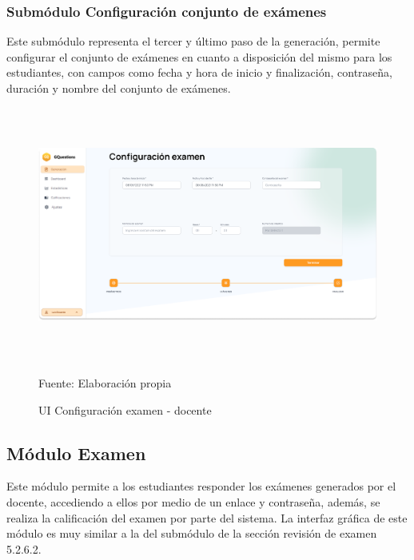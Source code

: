 \documentclass[../Main.tex]{subfiles}
\begin{document}
    \subsubsection{Submódulo Configuración conjunto de exámenes}
    \begin{justify}
    Este submódulo representa el tercer y último paso de la generación, permite configurar el conjunto de exámenes en cuanto a disposición del mismo para los estudiantes, con campos como fecha y hora de inicio y finalización, contraseña, duración y nombre del conjunto de exámenes.
    
    \begin{figure}[H]
	\begin{Center}
		\includegraphics[width=6.4in,height=3.3in]{Images/ui_docente_conf_examen.png}
	    \caption{UI Configuración examen - docente}
	    Fuente: Elaboración propia
        \label{fig:section}
	\end{Center}
    \end{figure}
    \end{justify}
    
    \subsection{Módulo Examen}
    \begin{justify}
    Este módulo permite a los estudiantes responder los exámenes generados por el docente, accediendo a ellos por medio de un enlace y contraseña, además, se realiza la calificación del examen por parte del sistema. La interfaz gráfica de este módulo es muy similar a la del submódulo de la sección revisión de examen 5.2.6.2.
    \end{justify}
    
\end{document}
